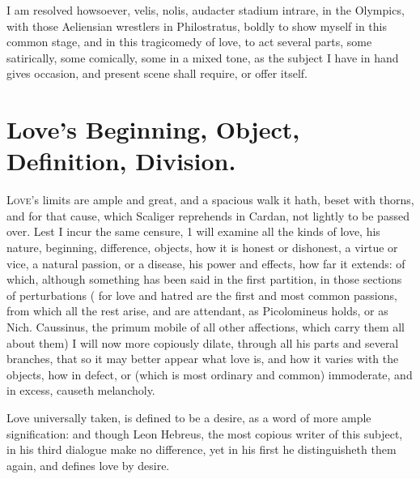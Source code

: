 {I am resolved howsoever, velis, nolis, audacter stadium intrare, in the
Olympics, with those Aeliensian wrestlers in Philostratus, boldly to
show myself in this common stage, and in this tragicomedy of love, to
act several parts, some satirically, some comically, some in a mixed
tone, as the subject I have in hand gives occasion, and present scene
shall require, or offer itself.

\section{Love's Beginning, Object, Definition, Division.}

\lettrine{L}{ove}'s limits are ample and great, and a spacious walk it hath, beset
with thorns, and for that cause, which Scaliger reprehends in
Cardan, not lightly to be passed over. Lest I incur the same censure, 1
will examine all the kinds of love, his nature, beginning, difference,
objects, how it is honest or dishonest, a virtue or vice, a natural
passion, or a disease, his power and effects, how far it extends: of
which, although something has been said in the first partition, in
those sections of perturbations ( for love and hatred are the
first and most common passions, from which all the rest arise, and are
attendant, as Picolomineus holds, or as Nich. Caussinus, the primum
mobile of all other affections, which carry them all about them) I will
now more copiously dilate, through all his parts and several branches,
that so it may better appear what love is, and how it varies with the
objects, how in defect, or (which is most ordinary and common)
immoderate, and in excess, causeth melancholy.

Love universally taken, is defined to be a desire, as a word of more
ample signification: and though Leon Hebreus, the most copious writer
of this subject, in his third dialogue make no difference, yet in his
first he distinguisheth them again, and defines love by desire.

}
